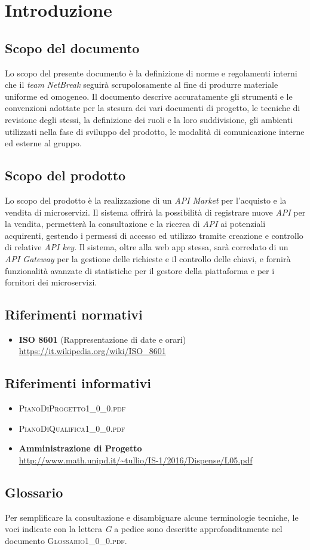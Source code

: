\newpage
\section{Introduzione}

\subsection{Scopo del documento}
Lo scopo del presente documento è la definizione di norme e regolamenti interni che il \textit{team} \textit{NetBreak} seguirà scrupolosamente al fine di produrre materiale uniforme ed omogeneo. Il documento descrive accuratamente gli strumenti e le convenzioni adottate per la stesura dei vari documenti di progetto, le tecniche di revisione degli stessi, la definizione dei ruoli e la loro suddivisione, gli ambienti utilizzati nella fase di sviluppo del prodotto, le modalità di comunicazione interne ed esterne al gruppo.

\subsection{Scopo del prodotto}
Lo scopo del prodotto è la realizzazione di un \textit{API Market} per l'acquisto e la vendita di microservizi. Il sistema offrirà la possibilità di registrare nuove \textit{API} per la vendita, permetterà la consultazione e la ricerca di \textit{API} ai potenziali acquirenti, gestendo i permessi di accesso ed utilizzo tramite creazione e controllo di relative \textit{API key}. Il sistema, oltre alla web app stessa, sarà corredato di un \textit{API Gateway} per la gestione delle richieste e il controllo delle chiavi, e fornirà funzionalità avanzate di statistiche per il gestore della piattaforma e per i fornitori dei microservizi.

\subsection{Riferimenti normativi}
\begin{itemize}
	\item \textbf{ISO 8601} (Rappresentazione di date e orari)\\
	\url{https://it.wikipedia.org/wiki/ISO\_8601}
\end{itemize}

\subsection{Riferimenti informativi}
\begin{itemize}
	\item \textsc{PianoDiProgetto1\_0\_0.pdf}
	\item \textsc{PianoDiQualifica1\_0\_0.pdf}
	\item \textbf{Amministrazione di Progetto}\\
	\url{http://www.math.unipd.it/~tullio/IS-1/2016/Dispense/L05.pdf}
\end{itemize}

\subsection{Glossario}
Per semplificare la consultazione e disambiguare alcune terminologie tecniche, le voci indicate con la lettera \textit{G} a pedice sono descritte approfonditamente nel documento \textsc{Glossario1\_0\_0.pdf}.